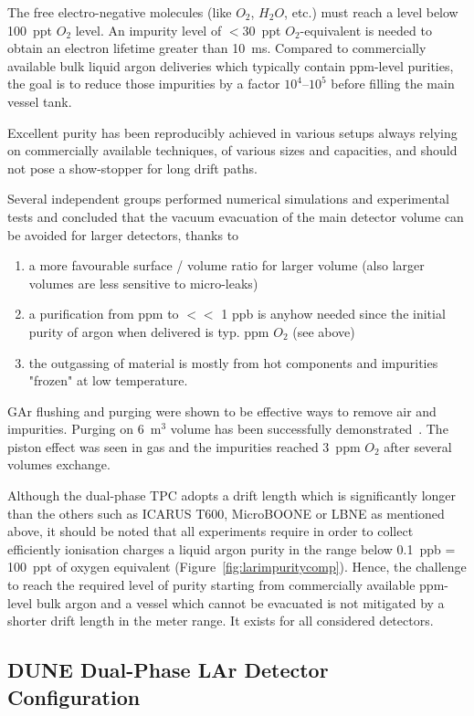 The  free electro-negative molecules (like $O_2$, $H_2O$, etc.) must reach a level below 100~ppt $O_2$ level. An impurity level 
of $<30$~ppt $O_2$-equivalent is needed to obtain an electron lifetime greater than 10~ms. Compared to commercially available bulk liquid argon deliveries which typically contain ppm-level purities, the goal is to reduce those impurities by a factor $10^4$--$10^5$ before filling the main vessel tank. 

Excellent purity has been reproducibly achieved in various setups always relying on commercially available techniques, of various sizes and capacities, and should not pose a  show-stopper for long drift paths.

Several independent groups performed numerical simulations and experimental tests and  concluded that the vacuum evacuation of the main detector volume can be avoided for larger detectors, thanks to 
\begin{enumerate}
\item{ a more favourable surface / volume ratio for larger volume 
(also larger volumes are less sensitive to micro-leaks)}
\item{ a purification from ppm to $<<$ 1 ppb is anyhow needed
since the initial purity of argon when delivered is typ. ppm $O_2$ (see above)}
\item{  the outgassing of material is mostly from hot components
and impurities "frozen" at low temperature.}
\end{enumerate}

GAr flushing and purging were shown to be effective ways to remove air and impurities. Purging on 6~m$^3$ volume has been successfully demonstrated~\cite{Curioni:2010gd}. The piston effect was seen in gas and the impurities reached 3~ppm $O_2$ after several volumes exchange.

Although the dual-phase TPC adopts a drift length which is significantly longer than the others such as ICARUS T600, MicroBOONE or LBNE as mentioned above, it should be noted that all experiments require in order to collect efficiently ionisation charges a liquid argon purity
in the range below 0.1~ppb = 100~ppt of oxygen equivalent (Figure~\ref{fig:larimpuritycomp}).  Hence, the challenge to reach the required level of purity starting from commercially available ppm-level bulk argon and a vessel which cannot be evacuated  is not mitigated by a shorter drift length in the meter range. It exists for all considered detectors.

\subsection{DUNE Dual-Phase LAr Detector Configuration}

